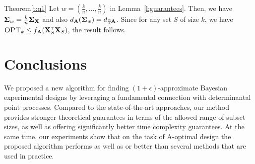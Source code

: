 \documentclass[11pt]{article}
\begin{document}
\begin{proofof}{Theorem}{\ref{t:q1}}
Let $w=(\frac kn,...,\frac kn)$ in Lemma~\ref{l:guarantees}. Then, we have
$\mathbf{\Sigma}_w=\frac kn\mathbf{\Sigma}_{\mathbf X}$ and also $d_{\mathbf A}(\mathbf{\Sigma}_w) =
d_{\frac nk\!\mathbf A}$. Since for any set $S$ of size $k$, we
have $\opt\leq f_{\A}(\X_S^\top\X_S)$, the result follows.
\end{proofof}



\section{Conclusions}

We proposed a new algorithm for finding
$(1+\epsilon)$-approximate Bayesian experimental designs by leveraging 
a fundamental connection with determinantal point processes. Compared
to the state-of-the-art approaches, our
method provides stronger theoretical guarantees in terms of the allowed
range of subset sizes, as well as
offering significantly better time complexity guarantees. At the same
time, our experiments show that on the task of A-optimal design the
proposed algorithm performs as well as or better than several methods that
are used in practice. 







\newpage
\appendix

\onecolumn
\end{document}
